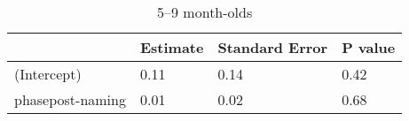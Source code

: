 


\begin{table}[tbp]

\begin{center}
\begin{threeparttable}

\caption{\label{tab:r2-cn-prepost-glmers-agegroup-tabs}5--9 month-olds}

\begin{tabular}{llll}
\toprule
 & \multicolumn{1}{c}{Estimate} & \multicolumn{1}{c}{Standard Error} & \multicolumn{1}{c}{P value}\\
\midrule
(Intercept) & 0.11 & 0.14 & 0.42\\
phasepost-naming & 0.01 & 0.02 & 0.68\\
\bottomrule
\end{tabular}

\end{threeparttable}
\end{center}

\end{table}



